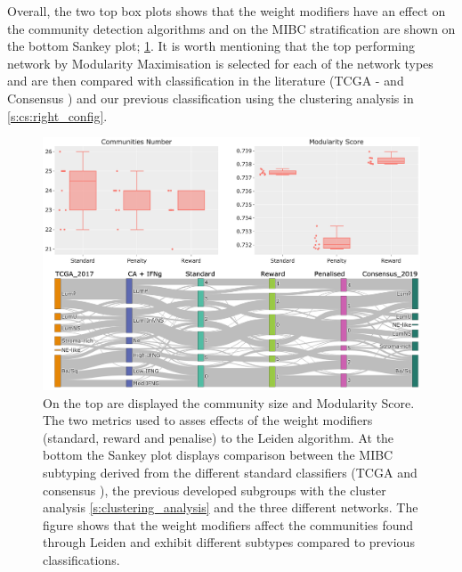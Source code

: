 Overall, the two top box plots shows that the weight modifiers have an effect on the community detection algorithms and on the MIBC stratification are shown on the bottom Sankey plot; \cref{fig:N_I:tum_leiden_modifiers}. It is worth mentioning that the top performing network by Modularity Maximisation is selected for each of the network types and are then compared with classification in the literature (TCGA - \citep{Robertson2017-mg} and Consensus \citep{Kamoun2020-tj}) and our previous classification using the clustering analysis in \cref{s:cs:right_config}. 


\begin{figure}[!t]    
    \centering
    \includegraphics[width=1.0\textwidth,keepaspectratio]{Sections/Network_I/Resources/Tum_network/LeidenMetrics_Sankey_TF-6.png}
    \caption{On the top are displayed the community size and Modularity Score. The two metrics used to asses effects of the weight modifiers (standard, reward and penalise) to the Leiden algorithm. At the bottom the Sankey plot displays comparison between the MIBC subtyping derived from the different standard classifiers (TCGA \citep{Robertson2017-mg} and consensus \citep{Kamoun2020-tj}), the previous developed subgroups with the cluster analysis \cref{s:clustering_analysis} and the three different networks. The figure shows that the weight modifiers affect the communities found through Leiden and exhibit different subtypes compared to previous classifications.}
    \label{fig:N_I:tum_leiden_modifiers}
\end{figure}

